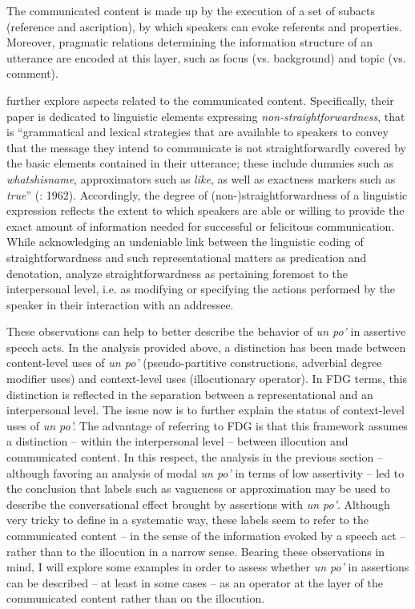 The communicated content is made up by the execution of a set of subacts (reference and ascription), by which speakers can evoke referents and properties. Moreover, pragmatic relations determining the information structure of an utterance are encoded at this layer, such as focus (vs. background) and topic (vs. comment).\textsuperscript{}

\citet{HengeveldKeizer2011} further explore aspects related to the communicated content. Specifically, their paper is dedicated to linguistic elements expressing \textit{non-straightforwardness}, that is “grammatical and lexical strategies that are available to speakers to convey that the message they intend to communicate is not straightforwardly covered by the basic elements contained in their utterance; these include dummies such as \textit{whatshisname}, approximators such as \textit{like}, as well as exactness markers such as \textit{true}” (\citealt{HengeveldKeizer2011}: 1962). Accordingly, the degree of (non-)straightforwardness of a linguistic expression reflects the extent to which speakers are able or willing to provide the exact amount of information needed for successful or felicitous communication. While acknowledging an undeniable link between the linguistic coding of straightforwardness and such representational matters as predication and denotation, \citet[1964]{HengeveldKeizer2011} analyze straightforwardness as pertaining foremost to the interpersonal level, i.e. as modifying or specifying the actions performed by the speaker in their interaction with an addressee.

These observations can help to better describe the behavior of \textit{un po’} in assertive speech acts. In the analysis provided above, a distinction has been made between content-level uses of \textit{un po’} (pseudo-partitive constructions, adverbial degree modifier uses) and context-level uses (illocutionary operator). In FDG terms, this distinction is reflected in the separation between a representational and an interpersonal level. The issue now is to further explain the status of context-level uses of \textit{un po’.} The advantage of referring to FDG is that this framework assumes a distinction – within the interpersonal level – between illocution and communicated content. In this respect, the analysis in the previous section – although favoring an analysis of modal \textit{un po’} in terms of low assertivity – led to the conclusion that labels such as vagueness or approximation may be used to describe the conversational effect brought by assertions with \textit{un po’}. Although very tricky to define in a systematic way, these labels seem to refer to the communicated content – in the sense of the information evoked by a speech act – rather than to the illocution in a narrow sense. Bearing these observations in mind, I will explore some examples in order to assess whether \textit{un po’} in assertions can be described – at least in some cases – as an operator at the layer of the communicated content rather than on the illocution.

